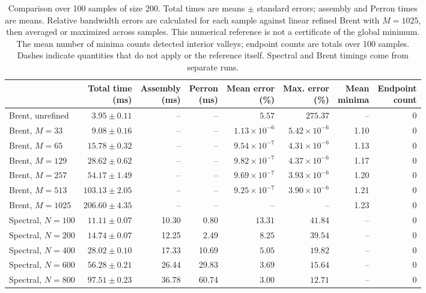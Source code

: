 \begin{table}[htbp]
\centering
\scriptsize
\setlength{\tabcolsep}{3pt}
\begin{tabular}{lrrrrrrr}
\toprule
& \shortstack{Total time\\(ms)} & \shortstack{Assembly\\(ms)} & \shortstack{Perron\\(ms)} & \shortstack{Mean error\\(\%)} & \shortstack{Max. error\\(\%)} & \shortstack{Mean\\minima} & \shortstack{Endpoint\\count} \\
\midrule
Brent, unrefined & $3.95 \pm 0.11$ & -- & -- & $5.57$ & $275.37$ & -- & 0 \\
Brent, $M=33$ & $9.08 \pm 0.16$ & -- & -- & $1.13\!\times\!10^{-6}$ & $5.42\!\times\!10^{-6}$ & 1.10 & 0 \\
Brent, $M=65$ & $15.78 \pm 0.32$ & -- & -- & $9.54\!\times\!10^{-7}$ & $4.31\!\times\!10^{-6}$ & 1.13 & 0 \\
Brent, $M=129$ & $28.62 \pm 0.62$ & -- & -- & $9.82\!\times\!10^{-7}$ & $4.37\!\times\!10^{-6}$ & 1.17 & 0 \\
Brent, $M=257$ & $54.17 \pm 1.49$ & -- & -- & $9.69\!\times\!10^{-7}$ & $3.93\!\times\!10^{-6}$ & 1.20 & 0 \\
Brent, $M=513$ & $103.13 \pm 2.05$ & -- & -- & $9.25\!\times\!10^{-7}$ & $3.90\!\times\!10^{-6}$ & 1.21 & 0 \\
Brent, $M=1025$ & $206.60 \pm 4.35$ & -- & -- & -- & -- & 1.23 & 0 \\
\midrule
Spectral, $N=100$ & $11.11 \pm 0.07$ & 10.30 & 0.80 & $13.31$ & $41.84$ & -- & 0 \\
Spectral, $N=200$ & $14.74 \pm 0.07$ & 12.25 & 2.49 & $8.25$ & $39.54$ & -- & 0 \\
Spectral, $N=400$ & $28.02 \pm 0.10$ & 17.33 & 10.69 & $5.05$ & $19.82$ & -- & 0 \\
Spectral, $N=600$ & $56.28 \pm 0.21$ & 26.44 & 29.83 & $3.69$ & $15.64$ & -- & 0 \\
Spectral, $N=800$ & $97.51 \pm 0.23$ & 36.78 & 60.74 & $3.00$ & $12.71$ & -- & 0 \\
\bottomrule
\end{tabular}
\caption{Comparison over 100 samples of size 200. Total times are means $\pm$ standard errors; assembly and Perron times are means. Relative bandwidth errors are calculated for each sample against linear refined Brent with $M=1025$, then averaged or maximized across samples. This numerical reference is not a certificate of the global minimum. The mean number of minima counts detected interior valleys; endpoint counts are totals over 100 samples. Dashes indicate quantities that do not apply or the reference itself. Spectral and Brent timings come from separate runs.}
\end{table}
